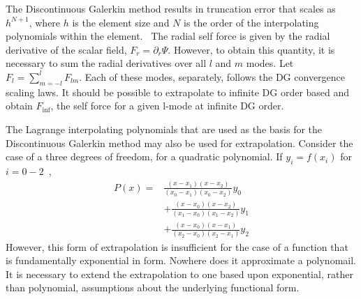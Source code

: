 The Discontinuous Galerkin method results in truncation error that scales as $h^{N+1}$, where $h$ is the element size and $N$ is the order of the interpolating polynomials within the element.~\cite{dghesthaven} The radial self force is given by the radial derivative of the scalar field, $F_r=\partial_r\Psi$. However, to obtain this quantity, it is necessary to sum the radial derivatives over all $l$ and $m$ modes. Let $F_l=\sum_{m=-l}^l F_{lm}$. Each of these modes, separately, follows the DG convergence scaling laws. It should be possible to extrapolate to infinite DG order based and obtain $F_{\inf}$, the self force for a given l-mode at infinite DG order.

The Lagrange interpolating polynomials that are used as the basis for the Discontinuous Galerkin method may also be used for extrapolation. Consider the case of a three degrees of freedom, for a quadratic polynomial. If $y_i=f(x_i)$ for $i=0-2$~\cite{NRinC++},
\begin{eqnarray}
P(x)=&\frac{(x-x_1)(x-x_2)}{(x_0-x_1)(x_0-x_2)}y_0\nonumber\\
&+\frac{(x-x_0)(x-x_2)}{(x_1-x_0)(x_1-x_2)}y_1\nonumber\\
&+\frac{(x-x_0)(x-x_1)}{(x_2-x_0)(x_2-x_1)}y_2
\end{eqnarray}
However, this form of extrapolation is insufficient for the case of a function that is fundamentally exponential in form. Nowhere does it approximate a polynomail. It is necessary to extend the extrapolation to one based upon exponential, rather than polynomial, assumptions about the underlying functional form.

